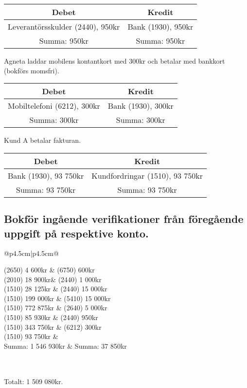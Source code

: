 \documentclass[a4paper, titlepage,12pt]{article}
\makeatletter
\newcommand\Taccount[3][4.5cm]%
   {{\renewcommand\arraystretch{1.3}%
    \begin{tabular}[t]{@{}p{#1}|p{#1}@{}}
    \multicolumn{2}{@{}c@{}}{#2}\\
    \hline
    #3
    \end{tabular}%
   }}
\makeatother
\begin{document}
			\begin{center}
				\begin{tabular}{|c|c|}
					\hline
					\textbf{Debet} & \textbf{Kredit} \\
					\hline
					Leverantörsskulder (2440), 950kr & Bank (1930), 950kr \\
					\hline
					Summa: 950kr & Summa: 950kr \\
					\hline
				\end{tabular}
			\end{center}


			Agneta laddar mobilens kontantkort med 300kr och betalar med bankkort (bokförs momsfri).
			\begin{center}
				\begin{tabular}{|c|c|}
					\hline
					\textbf{Debet} & \textbf{Kredit} \\
					\hline
					Mobiltelefoni (6212), 300kr & Bank (1930), 300kr \\
					\hline
					Summa: 300kr & Summa: 300kr \\
					\hline
				\end{tabular}
			\end{center}


			Kund A betalar fakturan.
			\begin{center}
				\begin{tabular}{|c|c|}
					\hline
					\textbf{Debet} & \textbf{Kredit} \\
					\hline
					Bank (1930), 93 750kr & Kundfordringar (1510), 93 750kr \\
					\hline
					Summa: 93 750kr & Summa: 93 750kr\\
					\hline
				\end{tabular}
			\end{center}

			\subsection{Bokför ingående verifikationer från föregående uppgift på respektive konto.}
			\Taccount{Bank (1930)}{
				(2650) 4 600kr & (6750) 600kr\\
				(2010) 18 900kr& (2440) 1 000kr\\
				(1510) 28 125kr & (2440) 15 000kr\\
				(1510) 199 000kr & (5410) 15 000kr\\
				(1510) 772 875kr & (2640) 5 000kr\\ 
				(1510) 85 930kr & (2440) 950kr\\
				(1510) 343 750kr & (6212) 300kr\\
				(1510) 93 750kr & \\
				Summa: 1 546 930kr & Summa: 37 850kr \\
			}\\\\
			Totalt: 1 509 080kr.
\end{document}
